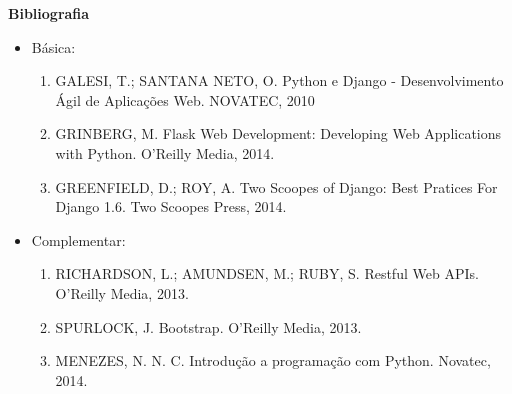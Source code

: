 





\begin{snugshade}\begin{center}\textbf{
    Bibliografia
}\end{center}\end{snugshade}

\begin{itemize} 

\item Básica:
    \begin{enumerate}

    \item GALESI, T.; SANTANA NETO, O.
          Python e Django - Desenvolvimento Ágil de Aplicações Web.
          NOVATEC, 2010

    \item GRINBERG, M.
          Flask Web Development: Developing Web Applications with Python.
          O'Reilly Media, 2014.

    \item GREENFIELD, D.; ROY, A.
          Two Scoopes of Django: Best Pratices For Django 1.6.
          Two Scoopes Press, 2014.
    

	
    \end{enumerate}

\item Complementar:
	\begin{enumerate} 

    \item RICHARDSON, L.; AMUNDSEN, M.; RUBY, S.
          Restful Web APIs.
          O'Reilly Media, 2013.

    \item SPURLOCK, J.
          Bootstrap.
          O'Reilly Media, 2013.

    \item MENEZES, N. N. C.
          Introdução a programação com Python.
          Novatec, 2014.

	\end{enumerate}

\end{itemize}



